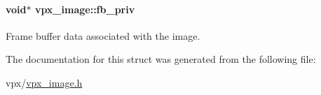 \paragraph[{\texorpdfstring{fb\+\_\+priv}{fb_priv}}]{\setlength{\rightskip}{0pt plus 5cm}void$\ast$ vpx\+\_\+image\+::fb\+\_\+priv}\hypertarget{structvpx__image_a4b138b7d146dc75ef5d8947d421b0533}{}\label{structvpx__image_a4b138b7d146dc75ef5d8947d421b0533}
Frame buffer data associated with the image. 

The documentation for this struct was generated from the following file\+:\begin{DoxyCompactItemize}
\item 
vpx/\hyperlink{vpx__image_8h}{vpx\+\_\+image.\+h}\end{DoxyCompactItemize}
